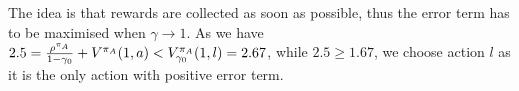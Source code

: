 \documentclass[envcountsame]{llncs}
\begin{document}
The idea is that rewards are collected as soon as possible, thus the error term has to be maximised
when \(\gamma \to 1\). As we have
\(2.5 = \frac{\rho^{\pi_{A}}}{1-\gamma_{0}} + V^{\pi_{A}}(1,a) < V^{\pi_{A}}_{\gamma_{0}}(1,l)
= 2.67\), while \(2.5 \geqslant 1.67\), we choose action \(l\) as it is the only action with
positive error term.


\end{document}
